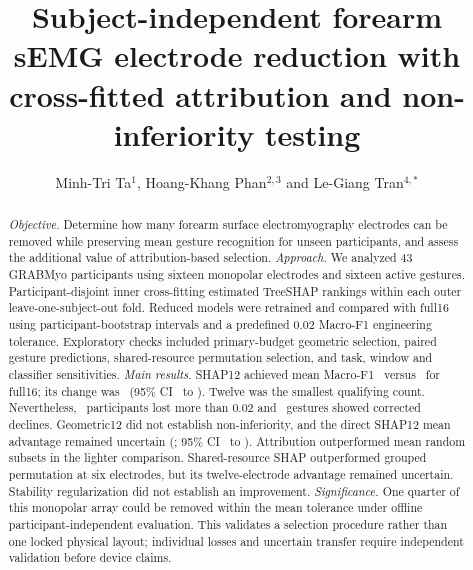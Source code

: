 \documentclass{iopjournal}
\begin{document}
\title{Subject-independent forearm sEMG electrode reduction with cross-fitted attribution and non-inferiority testing}
\author{Minh-Tri Ta$^1$, Hoang-Khang Phan$^{2,3}$ and Le-Giang Tran$^{4,*}$}







\begin{abstract}
\textit{Objective.} Determine how many forearm surface electromyography electrodes can be removed while preserving mean gesture recognition for unseen participants, and assess the additional value of attribution-based selection.
\textit{Approach.} We analyzed 43 GRABMyo participants using sixteen monopolar electrodes and sixteen active gestures. Participant-disjoint inner cross-fitting estimated TreeSHAP rankings within each outer leave-one-subject-out fold. Reduced models were retrained and compared with full16 using participant-bootstrap intervals and a predefined 0.02 Macro-F1 engineering tolerance. Exploratory checks included primary-budget geometric selection, paired gesture predictions, shared-resource permutation selection, and task, window and classifier sensitivities.
\textit{Main results.} SHAP12 achieved mean Macro-F1 \RevShapMean\ versus \RevPrimaryFull\ for full16; its change was \RevShapDelta\ (95\% CI \RevShapLow\ to \RevShapHigh). Twelve was the smallest qualifying count. Nevertheless, \RevLossCount\ participants lost more than 0.02 and \RevGestureLossCount\ gestures showed corrected declines. Geometric12 did not establish non-inferiority, and the direct SHAP12 mean advantage remained uncertain (\RevGeomContrast; 95\% CI \RevGeomContrastLow\ to \RevGeomContrastHigh). Attribution outperformed mean random subsets in the lighter comparison. Shared-resource SHAP outperformed grouped permutation at six electrodes, but its twelve-electrode advantage remained uncertain. Stability regularization did not establish an improvement.
\textit{Significance.} One quarter of this monopolar array could be removed within the mean tolerance under offline participant-independent evaluation. This validates a selection procedure rather than one locked physical layout; individual losses and uncertain transfer require independent validation before device claims.
\end{abstract}
\end{document}
